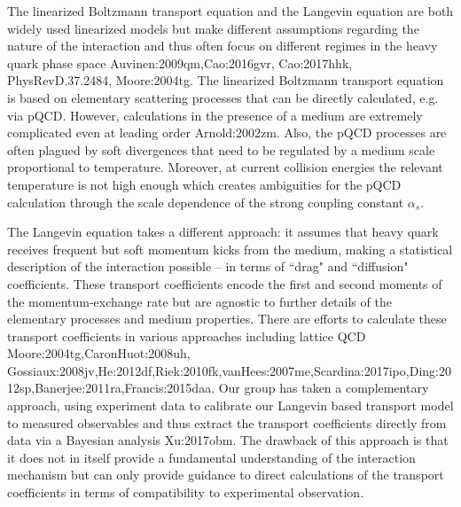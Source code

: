 The linearized Boltzmann transport equation and the Langevin equation are both widely used linearized models but make different assumptions regarding the nature of the interaction and thus often focus on different regimes in the heavy quark phase space {Auvinen:2009qm,Cao:2016gvr, Cao:2017hhk, PhysRevD.37.2484, Moore:2004tg}.
The linearized Boltzmann transport equation is based on elementary scattering processes that can be directly calculated, e.g. via pQCD.
However, calculations in the presence of a medium are extremely complicated even at leading order {Arnold:2002zm}.
Also, the pQCD processes are often plagued by soft divergences that need to be regulated by a medium scale proportional to temperature. Moreover, at current collision energies the relevant temperature is not high enough which creates ambiguities for the pQCD calculation through the scale dependence of the strong coupling constant $\alpha_s$.

The Langevin equation takes a different approach: 
it assumes that heavy quark receives frequent but soft momentum kicks from the medium, making a statistical description of the interaction possible -- in terms of ``drag" and ``diffusion" coefficients.
These transport coefficients encode the first and second moments of the momentum-exchange rate but are agnostic to further details of the elementary processes and medium properties.
There are efforts to calculate these transport coefficients in various approaches including lattice QCD {Moore:2004tg,CaronHuot:2008uh, Gossiaux:2008jv,He:2012df,Riek:2010fk,vanHees:2007me,Scardina:2017ipo,Ding:2012sp,Banerjee:2011ra,Francis:2015daa}. Our group has taken a complementary approach, using experiment data to calibrate our Langevin based transport model to measured observables and thus extract the transport coefficients directly from data via a Bayesian analysis {Xu:2017obm}. The drawback of this approach is that it does not in itself provide a fundamental understanding of the interaction mechanism but can only provide guidance to direct calculations of the transport coefficients in terms of compatibility to experimental observation.

